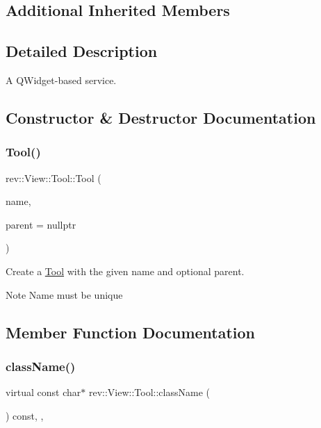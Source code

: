 \subsection*{Additional Inherited Members}


\subsection{Detailed Description}
A Q\+Widget-\/based service. 

\subsection{Constructor \& Destructor Documentation}
\mbox{\label{classrev_1_1_view_1_1_tool_a015ac5ba772e5ea5809e3d5926590f60}} 
\subsubsection{\texorpdfstring{Tool()}{Tool()}}
{\footnotesize\ttfamily rev\+::\+View\+::\+Tool\+::\+Tool (\begin{DoxyParamCaption}\item[{const Q\+String \&}]{name,  }\item[{Q\+Widget $\ast$}]{parent = {\ttfamily nullptr} }\end{DoxyParamCaption})}



Create a \mbox{\hyperlink{classrev_1_1_view_1_1_tool}{Tool}} with the given name and optional parent. 

\begin{DoxyNote}{Note}
Name must be unique 
\end{DoxyNote}


\subsection{Member Function Documentation}
\mbox{\label{classrev_1_1_view_1_1_tool_acde27fd51c9e99e42da65703b496c080}} 
\subsubsection{\texorpdfstring{className()}{className()}}
{\footnotesize\ttfamily virtual const char$\ast$ rev\+::\+View\+::\+Tool\+::class\+Name (\begin{DoxyParamCaption}{ }\end{DoxyParamCaption}) const\hspace{0.3cm}{\ttfamily [inline]}, {\ttfamily [override]}, {\ttfamily [virtual]}}



